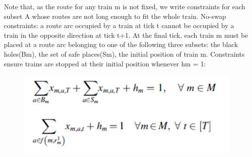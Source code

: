 \documentclass[sigplan,screen]{acmart}
\begin{document}
Note that, as the route for any train m is not fixed, we write constraints for each subset A whose routes are not long enough to fit the whole train.
No-swap constraints: a route arc occupied by a train at tick t cannot be occupied by a train in the opposite direction at tick t+1.
At the final tick, each train m must be placed at a route arc belonging to one of the following three subsets: the black holes(Bm), the set of safe places(Sm), the initial position of train m. Constraints ensure trains are stopped at their initial position whenever hm = 1: 
\begin{figure}[h]
    \centering
    \includegraphics[width=\linewidth]{2.png}
\end{figure}
\end{document}
